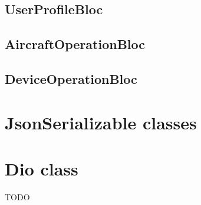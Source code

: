 \subsection{UserProfileBloc}\label{subsec:userprofilebloc}

\subsection{AircraftOperationBloc}\label{subsec:aircraftoperationbloc}

\subsection{DeviceOperationBloc}\label{subsec:deviceoperationbloc}


\section{JsonSerializable classes}\label{sec:jsonserializable-classes}

\section{Dio class}\label{sec:dio-class}

TODO